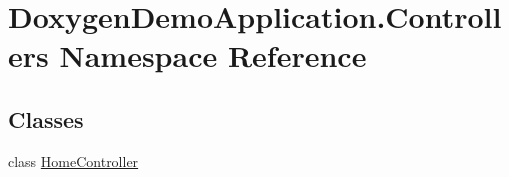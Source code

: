 \hypertarget{namespace_doxygen_demo_application_1_1_controllers}{}\section{Doxygen\+Demo\+Application.\+Controllers Namespace Reference}
\label{namespace_doxygen_demo_application_1_1_controllers}
\subsection*{Classes}
\begin{DoxyCompactItemize}
\item 
class \mbox{\hyperlink{class_doxygen_demo_application_1_1_controllers_1_1_home_controller}{Home\+Controller}}
\end{DoxyCompactItemize}
